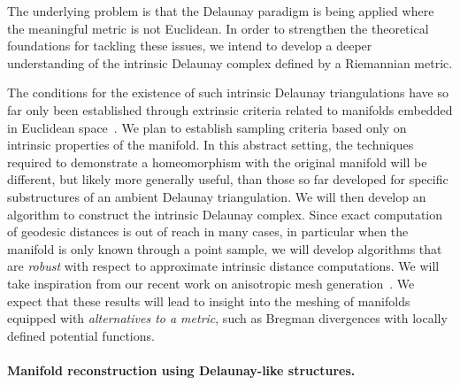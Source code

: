 The underlying problem is that the Delaunay paradigm is being applied
where the meaningful metric is not Euclidean.  In order to strengthen
the theoretical foundations for tackling these issues, we intend to
develop a deeper understanding of the intrinsic Delaunay complex
defined by a Riemannian metric.
%

The conditions for the existence of such intrinsic Delaunay
triangulations have so far only been established through extrinsic
criteria related to manifolds embedded in Euclidean space~\cite{boissonnat2012stab}. We plan to
establish sampling criteria based only on intrinsic properties of the
manifold. In this abstract setting, the techniques required to
demonstrate a homeomorphism with the original manifold will be
different, but likely more generally useful, than those so far
developed for specific substructures of an ambient Delaunay
triangulation.  We will then develop an algorithm to construct the
intrinsic Delaunay complex.  Since exact computation of geodesic
distances is out of reach in many cases, in particular when the
manifold is only known through a point sample, we will develop
algorithms that are {\em robust} with respect to approximate intrinsic
distance computations. We will take inspiration from our recent work
on anisotropic mesh generation~\cite{bwy-luam-08}.
We expect that these results will lead to insight into the meshing of
manifolds equipped with {\em alternatives to a metric}, such as Bregman
divergences with locally defined potential functions.

\paragraph{Manifold reconstruction using Delaunay-like structures.}

